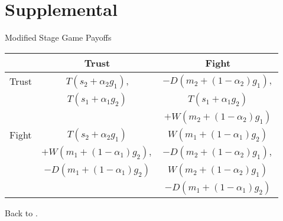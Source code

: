 \documentclass{beamer}
\begin{document}
\appendix
\section{Supplemental}
\begin{frame}[label=Supplemental,noframenumbering]
\begin{center}
Modified Stage Game Payoffs
\begin{tabular}{|l|c|c|}
  \hline      & Trust & Fight \\ \hline
	 Trust& \small$T(s_2+\alpha_2g_1)$, & \small$-D(m_2+(1-\alpha_2)g_1),$ \\
  & \small$T(s_1+\alpha_1g_2)$ & \small$T(s_1+\alpha_1g_2)  $\\ 
	&  & $+W(m_2+(1-\alpha_2)g_1) $\\ \hline
	Fight & \small$T(s_2+\alpha_2g_1)$& \small$W(m_1+(1-\alpha_1)g_2)$ \\
	      & \small$+W(m_1+(1-\alpha_1)g_2),$  & \small$-D(m_2+(1-\alpha_2)g_1),$ \\
	 & \small$-D(m_1+(1-\alpha_1)g_2) $ & \small$W(m_2+(1-\alpha_2)g_1)$ \\
	&  & \small$-D(m_1+(1-\alpha_1)g_2)$ \\ \hline
\end{tabular}
\end{center}

Back to \hyperlink{hurt}{}.
\end{frame}
\end{document}
